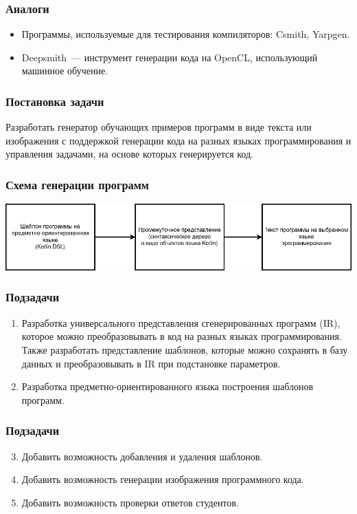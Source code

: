 \documentclass[14pt,aspectratio=169,hyperref={pdftex,unicode},xcolor=dvipsnames]{beamer}
\begin{document}
\begin{frame}
    \frametitle{Аналоги}
    \begin{itemize}
        \item Программы, используемые для тестирования компиляторов: Csmith, Yarpgen.
        \item Deepsmith~--- инструмент генерации кода на OpenCL, использующий машинное обучение.
    \end{itemize}
\end{frame}

\begin{frame}
    \frametitle{Постановка задачи}
    Разработать генератор обучающих примеров программ в виде текста или изображения с поддержкой
    генерации кода на разных языках программирования и управления задачами, на основе
    которых генерируется код.
\end{frame}


\begin{frame}
    \frametitle{Схема генерации программ}
    \begin{center}
        \includegraphics[width=\textwidth]{images/generation-steps.drawio.png}
    \end{center}
\end{frame}



\begin{frame}
    \frametitle{Подзадачи}
    \begin{enumerate}
        \item Разработка универсального представления сгенерированных программ (IR), которое можно
              преобразовывать в код на разных языках программирования. Также разработать представление шаблонов,
              которые можно сохранять в базу данных и преобразовывать в IR при подстановке параметров.
        \item Разработка предметно-ориентированного языка построения шаблонов программ.
    \end{enumerate}
\end{frame}

\begin{frame}
    \frametitle{Подзадачи}
    \begin{enumerate}
        \setcounter{enumi}{2}
        \item Добавить возможность добавления и удаления шаблонов.
        \item Добавить возможность генерации изображения программного кода.
        \item Добавить возможность проверки ответов студентов.
    \end{enumerate}
\end{frame}
\end{document}
